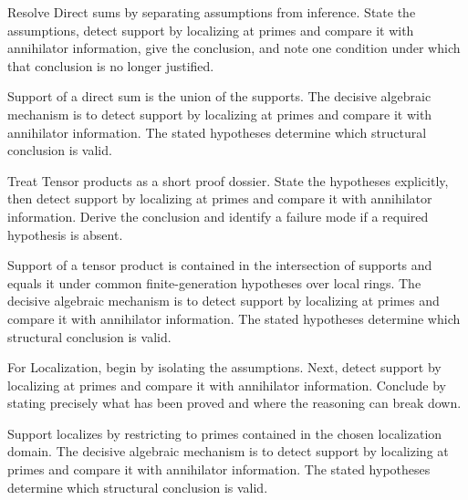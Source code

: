 \begin{problem}\label{prob:v16-problem-06}
Resolve Direct sums by separating assumptions from inference. State the assumptions, detect support by localizing at primes and compare it with annihilator information, give the conclusion, and note one condition under which that conclusion is no longer justified.
\end{problem}
\begin{solution}
Support of a direct sum is the union of the supports. The decisive algebraic mechanism is to detect support by localizing at primes and compare it with annihilator information. The stated hypotheses determine which structural conclusion is valid.
\end{solution}

\begin{problem}\label{prob:v16-problem-07}
Treat Tensor products as a short proof dossier. State the hypotheses explicitly, then detect support by localizing at primes and compare it with annihilator information. Derive the conclusion and identify a failure mode if a required hypothesis is absent.
\end{problem}
\begin{solution}
Support of a tensor product is contained in the intersection of supports and equals it under common finite-generation hypotheses over local rings. The decisive algebraic mechanism is to detect support by localizing at primes and compare it with annihilator information. The stated hypotheses determine which structural conclusion is valid.
\end{solution}

\begin{problem}\label{prob:v16-problem-08}
For Localization, begin by isolating the assumptions. Next, detect support by localizing at primes and compare it with annihilator information. Conclude by stating precisely what has been proved and where the reasoning can break down.
\end{problem}
\begin{solution}
Support localizes by restricting to primes contained in the chosen localization domain. The decisive algebraic mechanism is to detect support by localizing at primes and compare it with annihilator information. The stated hypotheses determine which structural conclusion is valid.
\end{solution}

